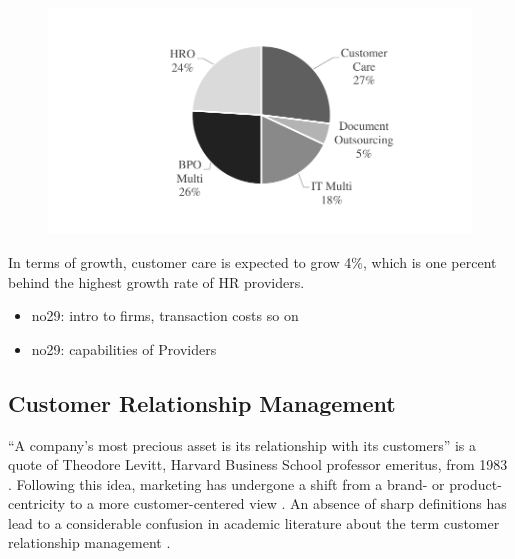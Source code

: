 		\begin{figure}[caption={BPO market composition}, label={fig:bpomarket}]
			{	\includegraphics[width=.8\textwidth]{figures/bpomarket.pdf}}
		\end{figure}
	
		In terms of growth, customer care is expected to grow 4\%, which is one percent behind the highest growth rate of HR providers. 
		
	
		
		
		\begin{itemize}
			\item no29: intro to firms, transaction costs so on
			\item no29: capabilities of Providers
		\end{itemize}
		\subsection{Customer Relationship Management}
		\label{sec:crm}
		\enquote{A company's most precious asset is its relationship with its customers} is a quote of Theodore Levitt, Harvard Business School professor emeritus, from 1983 \citep{levitt1983}. Following this idea, marketing has undergone a shift from a brand- or product-centricity to a more customer-centered view \citep{Chen_2003}. An absence of sharp definitions has lead to a considerable confusion in academic literature about the term customer relationship management \citep{paynefrow2005}. 
		
